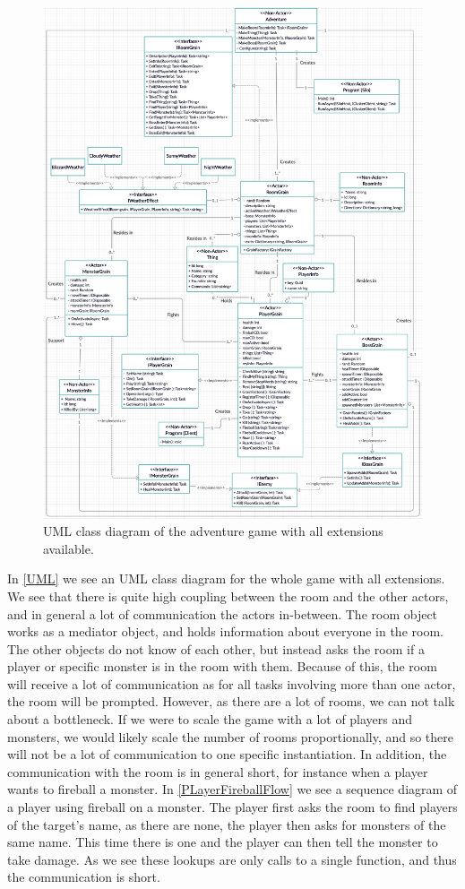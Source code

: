 \begin{figure}[H]
	\centering
	\includegraphics[width=\linewidth]{Materials/Adventuregame/ClassDiagram}
	\caption{UML class diagram of the adventure game with all extensions available.}
	\label{UML}
\end{figure}
In \autoref{UML} we see an UML class diagram for the whole game with all extensions. We see that there is quite high coupling between the room and the other actors, and in general a lot of communication the actors in-between. The room object works as a mediator object, and holds information about everyone in the room. The other objects do not know of each other, but instead asks the room if a player or specific monster is in the room with them. Because of this, the room will receive a lot of communication as for all tasks involving more than one actor, the room will be prompted. However, as there are a lot of rooms, we can not talk about a bottleneck. If we were to scale the game with a lot of players and monsters, we would likely scale the number of rooms proportionally, and so there will not be a lot of communication to one specific instantiation. In addition, the communication with the room is in general short, for instance when a player wants to fireball a monster. In \autoref{PLayerFireballFlow} we see a sequence diagram of a player using fireball on a monster. The player first asks the room to find players of the target's name, as there are none, the player then asks for monsters of the same name. This time there is one and the player can then tell the monster to take damage. As we see these lookups are only calls to a single function, and thus the communication is short.\\
